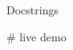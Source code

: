\begin{frame}[fragile]{Docstrings}

    \begin{pythoncode}
        # live demo
    \end{pythoncode}

\end{frame}



